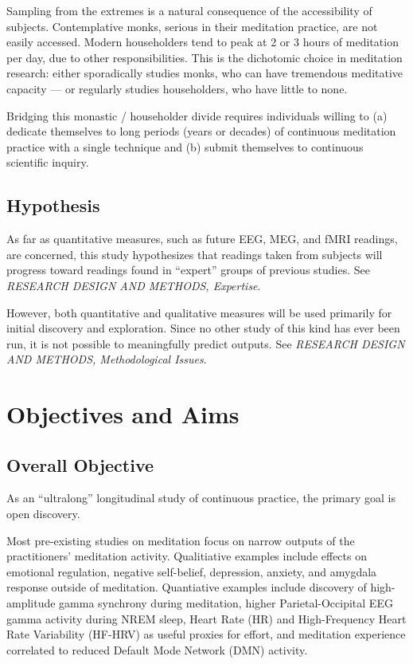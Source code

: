 \documentclass[a4paper, amsfonts, amssymb, amsmath, reprint, showkeys, nofootinbib, twoside]{revtex4-1}
\begin{document}
Sampling from the extremes is a natural consequence of the accessibility of subjects.
Contemplative monks, serious in their meditation practice, are not easily accessed.
Modern householders tend to peak at 2 or 3 hours of meditation per day,
due to other responsibilities.
This is the dichotomic choice in meditation research:
either sporadically studies monks, who can have tremendous meditative capacity
--- or regularly studies householders, who have little to none.

Bridging this monastic / householder divide requires individuals willing to
(a) dedicate themselves to long periods (years or decades) of continuous meditation
practice with a single technique and
(b) submit themselves to continuous scientific inquiry.

\subsection{Hypothesis}

As far as quantitative measures, such as future EEG, MEG, and fMRI readings, are concerned,
this study hypothesizes that readings taken from subjects will progress toward readings
found in ``expert'' groups of previous studies.
\cite{https://doi.org/10.1073/pnas.0407401101,https://doi.org/10.1371/journal.pone.0073417}
See \textit{RESEARCH DESIGN AND METHODS, Expertise}.

However, both quantitative and qualitative measures will be used primarily for
initial discovery and exploration.
Since no other study of this kind has ever been run, it is not possible to meaningfully
predict outputs.
See \textit{RESEARCH DESIGN AND METHODS, Methodological Issues}.

\section{Objectives and Aims}

\subsection{Overall Objective}

As an ``ultralong'' longitudinal study of continuous practice,
the primary goal is open discovery.

Most pre-existing studies on meditation focus on narrow outputs of the
practitioners' meditation activity.
Qualitiative examples include effects on emotional regulation, negative self-belief,
depression, anxiety, and amygdala response outside of meditation.
\cite{https://doi.org/10.1093/scan/nss054,
  https://doi.org/10.1037/a0018441,
  https://doi.org/10.31231/osf.io/hzv65}
Quantiative examples include discovery of high-amplitude gamma synchrony during meditation,
higher Parietal-Occipital EEG gamma activity during NREM sleep,
Heart Rate (HR) and High-Frequency Heart Rate Variability (HF-HRV) as useful proxies for effort,
and meditation experience correlated to reduced Default Mode Network (DMN) activity.
\cite{https://doi.org/10.1073/pnas.0407401101,
  https://doi.org/10.1371/journal.pone.0073417,
  https://doi.org/10.1016/j.ijpsycho.2015.04.017,
  https://doi.org/10.1073/pnas.1112029108}
\end{document}

